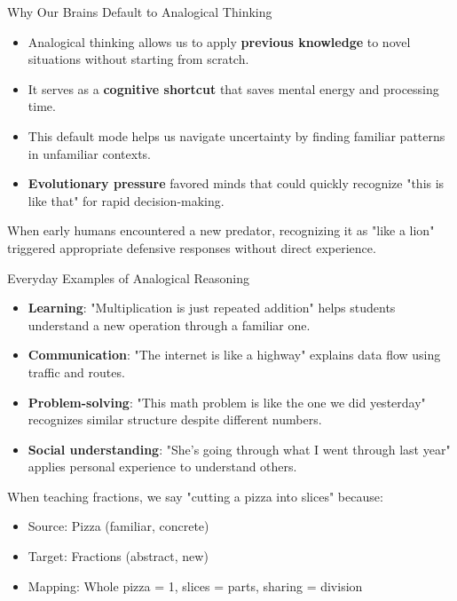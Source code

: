 \documentclass{beamer}
\begin{document}
	\begin{frame}{Why Our Brains Default to Analogical Thinking}
		\begin{itemize}
			\item Analogical thinking allows us to apply \textbf{previous knowledge} to novel situations without starting from scratch.
			\item It serves as a \textbf{cognitive shortcut} that saves mental energy and processing time.
			\item This default mode helps us navigate uncertainty by finding familiar patterns in unfamiliar contexts.
			\item \textbf{Evolutionary pressure} favored minds that could quickly recognize "this is like that" for rapid decision-making.
		\end{itemize}
		
		\begin{example}
			When early humans encountered a new predator, recognizing it as "like a lion" triggered appropriate defensive responses without direct experience.
		\end{example}
	\end{frame}
	
	
	\begin{frame}{Everyday Examples of Analogical Reasoning}
		\begin{itemize}
			\item \textbf{Learning}: "Multiplication is just repeated addition" helps students understand a new operation through a familiar one.
			\item \textbf{Communication}: "The internet is like a highway" explains data flow using traffic and routes.
			\item \textbf{Problem-solving}: "This math problem is like the one we did yesterday" recognizes similar structure despite different numbers.
			\item \textbf{Social understanding}: "She's going through what I went through last year" applies personal experience to understand others.
		\end{itemize}
		
		\begin{example}
			When teaching fractions, we say "cutting a pizza into slices" because:
			\begin{itemize}
				\item Source: Pizza (familiar, concrete)
				\item Target: Fractions (abstract, new)
				\item Mapping: Whole pizza = 1, slices = parts, sharing = division
			\end{itemize}
		\end{example}
	\end{frame}
	
\end{document}
